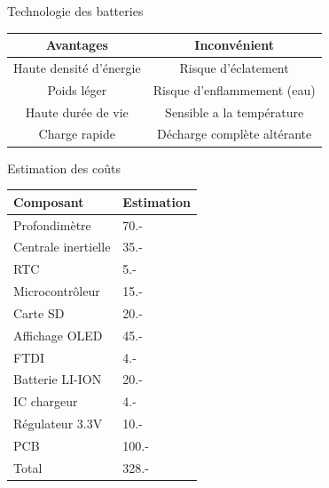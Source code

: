 \documentclass[compress,aspectratio=169]{beamer}
\begin{document}
\begin{frame}[containsverbatim]{Technologie des batteries}
	\par
	\begin{tabular}{c|c}
		Avantages &  Inconvénient\\
		\hline
		Haute densité d'énergie & Risque d'éclatement \\
		Poids léger & Risque d'enflammement (eau) \\ 
		Haute durée de vie & Sensible a la température \\
		Charge rapide & Décharge complète altérante \\
	\end{tabular}
	\par
\end{frame}

\begin{frame}[containsverbatim]{Estimation des coûts}
	\begin{center}
		\begin{tabular}{l|l}
			Composant & Estimation \\
			\hline
			Profondimètre & 70.- \\
			Centrale inertielle & 35.- \\
			RTC & 5.- \\
			Microcontrôleur & 15.- \\
			Carte SD & 20.- \\
			Affichage OLED & 45.- \\
			FTDI & 4.- \\
			Batterie LI-ION & 20.- \\
			IC chargeur & 4.- \\
			Régulateur 3.3V & 10.- \\
			PCB & 100.- \\
			\hline
			\hline
			\vspace{+5pt}Total & 328.-
		\end{tabular} 
	\end{center}
\end{frame}
\end{document}
